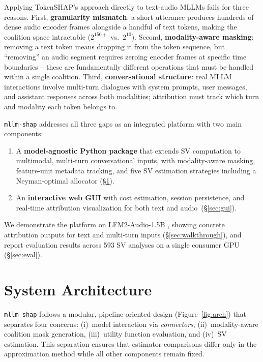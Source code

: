 \documentclass[11pt]{article}
\begin{document}
Applying TokenSHAP's approach directly to text-audio MLLMs fails for three reasons.
First, \textbf{granularity mismatch}: a short utterance produces hundreds of dense audio encoder frames alongside a handful of text tokens, making the coalition space intractable ($2^{150+}$ vs.\ $2^{10}$).
Second, \textbf{modality-aware masking}: removing a text token means dropping it from the token sequence, but ``removing'' an audio segment requires zeroing encoder frames at specific time boundaries -- these are fundamentally different operations that must be handled within a single coalition.
Third, \textbf{conversational structure}: real MLLM interactions involve multi-turn dialogues with system prompts, user messages, and assistant responses across both modalities; attribution must track which turn and modality each token belongs to.

\texttt{mllm-shap} addresses all three gaps as an integrated platform with two main components:

\begin{enumerate}[itemsep=2pt]
    \item A \textbf{model-agnostic Python package} that extends SV computation to multimodal, multi-turn conversational inputs, with modality-aware masking, feature-unit metadata tracking, and five SV estimation strategies including a Neyman-optimal allocator (\S\ref{sec:package}).
    \item An \textbf{interactive web GUI} with cost estimation, session persistence, and real-time attribution visualization for both text and audio~(\S\ref{sec:gui}).
\end{enumerate}

We demonstrate the platform on LFM2-Audio-1.5B \citep{LIQUID_LFM2_AUDIO_2025}, showing concrete attribution outputs for text and multi-turn inputs (\S\ref{sec:walkthrough}), and report evaluation results across 593 SV analyses on a single consumer GPU (\S\ref{sec:eval}).

\section{System Architecture}
\label{sec:package}

\texttt{mllm-shap} follows a modular, pipeline-oriented design (Figure~\ref{fig:arch}) that separates four concerns: (i)~model interaction via \emph{connectors}, (ii)~modality-aware coalition mask generation, (iii)~utility function evaluation, and (iv)~SV estimation.
This separation ensures that estimator comparisons differ only in the approximation method while all other components remain fixed.
\end{document}
